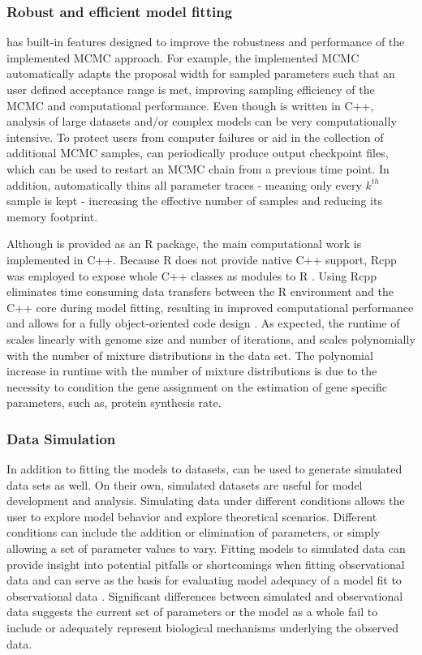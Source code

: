 \subsubsection{Robust and efficient model fitting}
\package has built-in features designed to improve the robustness and performance of the implemented MCMC approach. 
For example, the implemented MCMC automatically adapts the proposal width for sampled parameters such that an user defined acceptance range is met, improving sampling efficiency of the MCMC and computational performance.
Even though \package is written in C++, analysis of large datasets and/or complex models can be very computationally intensive.
To protect users from computer failures or aid in the collection of additional MCMC samples, \package can periodically produce output checkpoint files, which can be used to restart an MCMC chain from a previous time point.
In addition, \package automatically thins all parameter traces -  meaning only every $k^{th}$ sample is kept - increasing the effective number of samples and reducing its memory footprint. 

Although \package is provided as an R package, the main computational work is implemented in C++.
Because R does not provide native C++ support, Rcpp was employed to expose whole C++ classes as modules to R \citep{rcpp_package}.
Using Rcpp eliminates time consuming data transfers between the R environment and the C++ core during model fitting, resulting in improved computational performance and allows for a fully object-oriented code design \citep{ood_book}. 
As expected, the runtime of \package scales linearly with genome size and number of iterations, and scales polynomially with the number of mixture distributions in the data set. 
The polynomial increase in runtime with the number of mixture distributions is due to the necessity to condition the gene assignment on the estimation of gene specific parameters, such as, protein synthesis rate.

\subsubsection{Data Simulation}
In addition to fitting the models to datasets, \package can be used to generate simulated data sets as well.
On their own, simulated datasets are useful for model development and analysis.
Simulating data under different conditions allows the user to explore model behavior and explore theoretical scenarios. 
Different conditions can include the addition or elimination of parameters, or simply allowing a set of parameter values to vary.
Fitting models to simulated data can provide insight into potential pitfalls or shortcomings when fitting observational data and can serve as the basis for evaluating model adequacy of a model fit to observational data \citep{gumi2015}.
Significant differences between simulated and observational data suggests the current set of parameters or the model as a whole fail to include or adequately represent biological mechanisms underlying the observed data.
 
